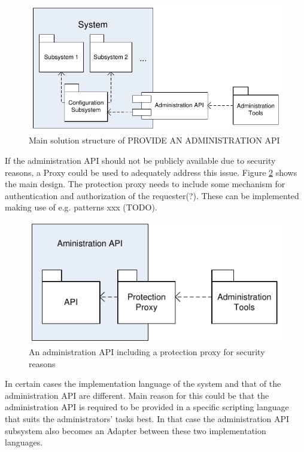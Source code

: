 \begin{figure}[h]
\centering
\includegraphics{patterns/provideAPIDiagram-01.pdf}
\caption{Main solution structure of PROVIDE AN ADMINISTRATION API}
\label{fig:provideAPIDiagram-01}
\end{figure}

If the administration API should not be publicly available due to security reasons, a {\sc Proxy} \cite{Buschmann1996} could be used to adequately address this issue. Figure \ref{fig:provideAPIDiagram-02} shows the main design. The protection proxy needs to include some mechanism for authentication and authorization of the requester(?). These can be implemented making use of e.g. patterns xxx (TODO).

\begin{figure}[h]
\centering
\includegraphics{patterns/provideAPIDiagram-02.pdf}
\caption{An administration API including a protection proxy for security reasons}
\label{fig:provideAPIDiagram-02}
\end{figure}

In certain cases the implementation language of the system and that of the administration API are different. Main reason for this could be that the administration API is required to be provided in a specific scripting language that suits the administrators' tasks best. In that case the administration API subsystem also becomes an {\sc Adapter} \cite{Gamma95} between these two implementation languages.

